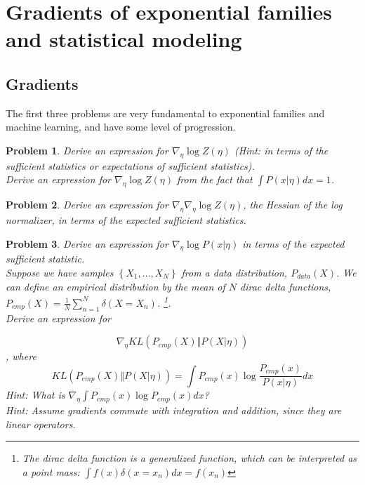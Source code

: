 \documentclass[a4paper]{article}
\newtheorem{problem}{Problem}[section]
\begin{document}
\section{Gradients of exponential families and statistical modeling}

\subsection{Gradients}

The first three problems are very fundamental to exponential families and machine learning, and have some level of progression.

\begin{problem}
Derive an expression for $ \nabla_\eta \log Z(\eta) $ (Hint: in terms of the sufficient statistics or expectations of sufficient statistics). \\
Derive an expression for $ \nabla_\eta \log Z(\eta) $ from the fact that $ \int P( x \vert \eta) dx = 1 $.
\end{problem}

\begin{problem}
Derive an expression for $ \nabla_\eta \nabla_\eta \log Z(\eta) $, the Hessian of the log normalizer, in terms of the expected sufficient statistics.
\end{problem}

\begin{problem}
Derive an expression for $ \nabla_\eta \log P( x \vert \eta ) $ in terms of the expected sufficient statistic. \\
Suppose we have samples $\left\{ X_1, \ldots, X_N \right\}$ from a data distribution, $P_{data}(X)$. We can define an empirical distribution by the mean of $N$ dirac delta functions, $ P_{emp}(X) = \frac{1}{N} \sum_{n=1}^N \delta(X = X_n) $. \footnote{The dirac delta function is a generalized function, which can be interpreted as a point mass: $ \int f(x) \delta( x = x_n) dx = f(x_n)$}. \\
Derive an expression for

\begin{equation}
  \nabla_\eta KL\left( P_{emp}(X) \Vert P( X \vert \eta) \right) 
  \label{}
\end{equation},
where
\begin{equation}
  KL\left( P_{emp}(X) \Vert P( X \vert \eta) \right) = \int P_{emp}(x) \log \frac{P_{emp}(x)}{P( x \vert \eta) } dx
  \label{}
\end{equation}
Hint: What is $ \nabla_\eta \int P_{emp}(x) \log P_{emp}(x) dx$? \\
Hint: Assume gradients commute with integration and addition, since they are linear operators.
\end{problem}
\end{document}

